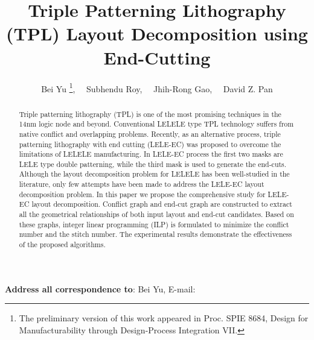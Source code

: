 \documentclass[12pt]{spieman}
\theoremstyle{plain}
\begin{document}
 


\title{
  Triple Patterning Lithography (TPL) Layout Decomposition using End-Cutting
}

\author{
  Bei Yu\supscr{}
  \footnote{The preliminary version of this work appeared in Proc. SPIE 8684, Design for Manufacturability through Design-Process Integration VII.},
  \ \ Subhendu Roy\supscr{}, \ \ Jhih-Rong Gao\supscr{}, \ \ David Z. Pan\supscr{}
}


\maketitle 

\begin{abstract}
Triple patterning lithography (TPL) is one of the most promising techniques in the 14nm logic node and beyond.
Conventional LELELE type TPL technology suffers from native conflict and overlapping problems.
Recently, as an alternative process, triple patterning lithography with end cutting (LELE-EC) was proposed to overcome the limitations of LELELE manufacturing.
In LELE-EC process the first two masks are LELE type double patterning,
while the third mask is used to generate the end-cuts.
Although the layout decomposition problem for LELELE has been well-studied in the literature,
only few attempts have been made to address the LELE-EC layout decomposition problem.
In this paper we propose the comprehensive study for LELE-EC layout decomposition.
Conflict graph and end-cut graph are constructed to extract all the geometrical relationships of both input layout and end-cut candidates.
Based on these graphs, integer linear programming (ILP) is formulated to minimize the conflict number and the stitch number.
The experimental results demonstrate the effectiveness of the proposed algorithms.
\end{abstract}



{\noindent
\footnotesize
{\bf Address all correspondence to}:
Bei Yu,
E-mail:  
}
\end{document}
